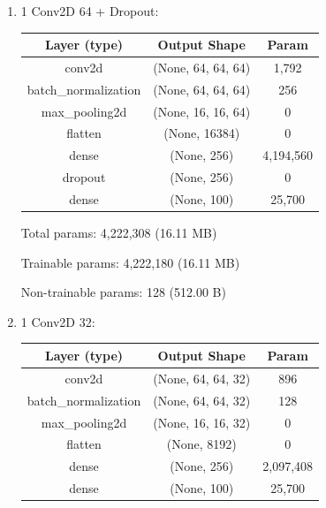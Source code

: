\documentclass{article}
\begin{document}
\begin{enumerate}
            \item 1 Conv2D 64 + Dropout:
            \begin{table}[h!]
                \begin{tabular}{| c | c | c |}
                    \hline
                    Layer (type) & Output Shape & Param \\
                    \hline
                    conv2d & (None, 64, 64, 64) & 1,792 \\
                    \hline
                    batch\_normalization & (None, 64, 64, 64) & 256 \\
                    \hline
                    max\_pooling2d & (None, 16, 16, 64) & 0 \\
                    \hline
                    flatten & (None, 16384) & 0 \\
                    \hline
                    dense & (None, 256) &  4,194,560 \\
                    \hline
                    dropout & (None, 256) & 0 \\
                    \hline
                    dense & (None, 100) &  25,700 \\
                    \hline
                \end{tabular}
            \end{table}

            Total params: 4,222,308 (16.11 MB)

            Trainable params: 4,222,180 (16.11 MB)

            Non-trainable params: 128 (512.00 B)
        
        \newpage
            \item 1 Conv2D 32:
            \begin{table}[h!]
                \begin{tabular}{| c | c | c |}
                    \hline
                    Layer (type) & Output Shape & Param \\
                    \hline
                    conv2d & (None, 64, 64, 32) & 896 \\
                    \hline
                    batch\_normalization & (None, 64, 64, 32) & 128 \\
                    \hline
                    max\_pooling2d & (None, 16, 16, 32) & 0 \\
                    \hline
                    flatten & (None, 8192) & 0 \\
                    \hline
                    dense & (None, 256) & 2,097,408 \\
                    \hline
                    dense & (None, 100) &  25,700 \\
                    \hline
                \end{tabular}
            \end{table}


\end{enumerate}
\end{document}
